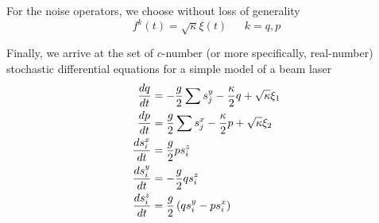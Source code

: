 \documentclass{article}
\begin{document}
For the noise operators, we choose without loss of generality
\begin{equation}
    f^k(t) = \sqrt{\kappa} \xi(t)\ \ \ \ \ \ \  k=q,p
\end{equation}

Finally, we arrive at the set of $c$-number (or more specifically, real-number) stochastic differential equations for a simple model of a beam laser
\begin{align}
    \notag \frac{dq}{dt} &= -\frac{g}{2}\sum s_j^y-\frac{\kappa}{2}q+\sqrt{\kappa}\xi_1\\
    \notag \frac{dp}{dt} &= \frac{g}{2}\sum s_j^x-\frac{\kappa}{2}p+\sqrt{\kappa}\xi_2\\
    \label{langevin;cnc}
    \frac{d s_i^x}{dt} &= \frac{g}{2} p s^z_i\\
    \notag \frac{d s_i^y}{dt} &= -\frac{g}{2}q s^z_i\\
    \notag \frac{d s_i^z}{dt} &= \frac{g}{2}\left(q s^y_i-p s_i^x\right)
\end{align}
\end{document}
